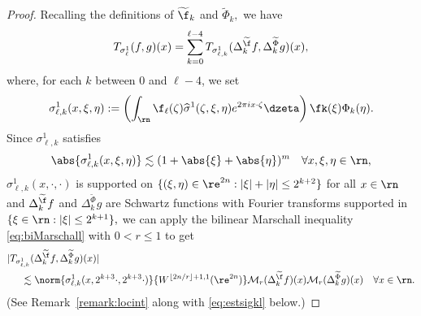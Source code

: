 \begin{proof}
Recalling the definitions of $\widetilde{\f}_k$ and $\widetilde{\Phi}_k,$  we have
\begin{align*}
T_{\sigma^1_\ell}(f,g)(x) = 
  \sum\limits_{k=0}^{\ell -4} T_{\sigma^1_{\ell,k}}(\Delta^{\widetilde{\f}}_k f,\Delta^{\widetilde{\Phi}}_k g)(x),
\end{align*}
where, for each $k$ between $0$ and $\ell -4$, we set 
$$
\sigma^1_{\ell, k}(x, \xi, \eta):=\left( \int_{\rn}  \f_\ell(\zeta) \widehat{\sigma}^1(\zeta, \xi, \eta) e^{2\pi i x \cdot \zeta}  \dzeta \right)  \fk(\xi) \Phi_k(\eta).
$$ 
Since $\sigma^1_{\ell,k}$ satisfies 
$$\abs{\sigma^1_{\ell,k}(x,\xi,\eta)}\lesssim (1+\abs{\xi}+\abs{\eta})^m\quad \forall x,\xi,\eta\in\rn,$$
$\sigma^1_{\ell, k}(x,\cdot,\cdot)$ is supported on $\{(\xi, \eta) \in \re^{2n} : |\xi| + |\eta| \leq 2^{k+2}\}$ for all $x\in\rn$ and $\Delta^{\widetilde{\f}}_k f$ and $\Delta^{\widetilde{\Phi}}_k g$ are Schwartz functions with  Fourier transforms  supported in $\{\xi \in \rn: |\xi| \le 2^{k+1}\},$  we can apply the bilinear Marschall inequality \eqref{eq:biMarschall} with $0<r\le 1$ to get 
\begin{align}\label{eq:bound:h1:ell:k}
&|T_{\sigma^1_{\ell,k}}(\Delta^{\widetilde{\f}}_k f,
\Delta^{\widetilde{\Phi}}_k g)(x)| \\
&\hspace{0.5cm}\lesssim  \norm{\sigma^1_{\ell, k}(x, 2^{k+3} \cdot, 2^{k+3} \cdot)}{W^{\lfloor{2n/r}\rfloor + 1,1}(\re^{2n})} \mathcal{M}_r(\Delta^{\widetilde{\f}}_k f)(x)\mathcal{M}_r(
\Delta^{\widetilde{\Phi}}_k g)(x)\quad \forall x\in\rn.\nonumber
\end{align}
(See Remark~\ref{remark:locint} along with \eqref{eq:estsigkl} below.)


\end{proof}

